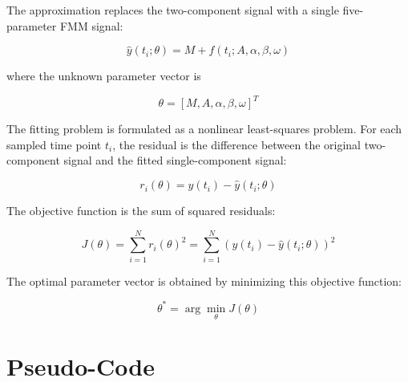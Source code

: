 \documentclass[a4paper]{article}
\begin{document}
        The approximation replaces the two-component signal with a single five-parameter FMM signal:
        
        \[
            \hat{y}(t_i; \theta)
            =
            M
            +
            f(t_i; A,\alpha,\beta,\omega)
        \]
        
        where the unknown parameter vector is
        
        \[
            \theta
            =
            \left[
                M,
                A,
                \alpha,
                \beta,
                \omega
            \right]^{T}
        \]
        
        The fitting problem is formulated as a nonlinear least-squares problem. For each sampled time point \(t_i\), the residual is the difference between the original two-component signal and the fitted single-component signal:
        
        \[
            r_i(\theta)
            =
            y(t_i)
            -
            \hat{y}(t_i; \theta)
        \]
        
        The objective function is the sum of squared residuals:
        
        \[
            J(\theta)
            =
            \sum_{i=1}^{N}
            r_i(\theta)^2
            =
            \sum_{i=1}^{N}
            \left(
                y(t_i)
                -
                \hat{y}(t_i; \theta)
            \right)^2
        \]
        
        The optimal parameter vector is obtained by minimizing this objective function:
        
        \[
            \theta^{*}
            =
            \arg\min_{\theta}
            J(\theta)
        \]
    
    
    \section{Pseudo-Code}
        
\end{document}
